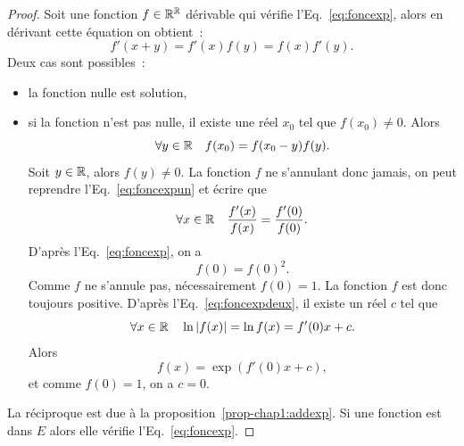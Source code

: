 \begin{proof} 
  Soit une fonction $f \in \mathbb{R}^{\mathbb{R}}$ dérivable qui vérifie l'Eq.~\eqref{eq:foncexp}, alors en dérivant cette équation on obtient~:
  \begin{equation} 
    \label{eq:foncexpun}
    f'(x+y)=f'(x)f(y)=f(x)f'(y).
  \end{equation}
  Deux cas sont possibles~:
  \begin{itemize}
  \item la fonction nulle est solution,
  \item si la fonction n'est pas nulle, il existe une réel $x_0$ tel que $f(x_0) \neq 0$. Alors 
    \begin{equation}
      \forall y \in \mathbb{R} \quad f(x_0)= f(x_0-y)f(y).
    \end{equation}
    Soit $y \in \mathbb{R}$, alors $f(y) \neq 0$. La fonction $f$ ne s'annulant donc jamais, on peut reprendre l'Eq.~\ref{eq:foncexpun} et écrire que 
    \begin{equation}
      \label{eq:foncexpdeux}
      \forall x \in \mathbb{R} \quad \frac{f'(x)}{f(x)}=\frac{f'(0)}{f(0)}.
    \end{equation}
    D'après l'Eq.~\ref{eq:foncexp}, on a 
    \begin{equation}
      f(0)=f(0)^2.
    \end{equation}
    Comme $f$ ne s'annule pas, nécessairement $f(0)=1$. La fonction $f$ est donc toujours positive. D'après l'Eq.~\eqref{eq:foncexpdeux}, il existe un réel $c$ tel que 
    \begin{equation}
      \forall x \in \mathbb{R} \quad \ln \left\lvert f(x)\right\rvert=\ln f(x)=f'(0) x + c.
    \end{equation}
    Alors 
    \begin{equation}
      f(x)=\exp(f'(0) x +c),
    \end{equation}
    et comme $f(0)=1$, on a $c=0$.
  \end{itemize}
  La réciproque est due à la proposition~\ref{prop-chap1:addexp}. Si une fonction est dans $E$ alors elle vérifie l'Eq.~\ref{eq:foncexp}.
\end{proof}
%
